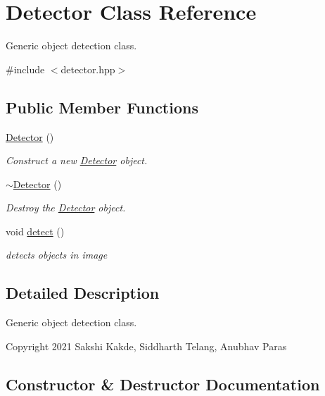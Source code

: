 \hypertarget{classDetector}{}\section{Detector Class Reference}
\label{classDetector}


Generic object detection class.  




{\ttfamily \#include $<$detector.\+hpp$>$}

\subsection*{Public Member Functions}
\begin{DoxyCompactItemize}
\item 
\hyperlink{classDetector_aa43b3d7bbd4b225855b4bcc93f70b225}{Detector} ()
\begin{DoxyCompactList}\small\item\em Construct a new \hyperlink{classDetector}{Detector} object. \end{DoxyCompactList}\item 
\mbox{\label{classDetector_ae16b7bf62f39cb287927d56ca17663d7}} 
\hyperlink{classDetector_ae16b7bf62f39cb287927d56ca17663d7}{$\sim$\+Detector} ()
\begin{DoxyCompactList}\small\item\em Destroy the \hyperlink{classDetector}{Detector} object. \end{DoxyCompactList}\item 
\mbox{\label{classDetector_ae0c0a72fef22d6521e82c18424a4dd04}} 
void \hyperlink{classDetector_ae0c0a72fef22d6521e82c18424a4dd04}{detect} ()
\begin{DoxyCompactList}\small\item\em detects objects in image \end{DoxyCompactList}\end{DoxyCompactItemize}


\subsection{Detailed Description}
Generic object detection class. 

Copyright 2021 Sakshi Kakde, Siddharth Telang, Anubhav Paras 

\subsection{Constructor \& Destructor Documentation}
\mbox{\label{classDetector_aa43b3d7bbd4b225855b4bcc93f70b225}} 
